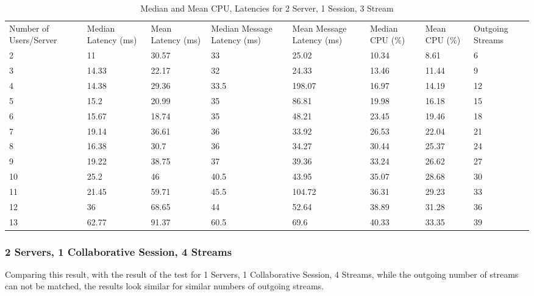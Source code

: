 \begin{table}
\caption{Median and Mean CPU, Latencies for 2 Server, 1 Session, 3 Stream}
\label{table:2serv_1sess_3str}
\begin{tabu} to\linewidth{|X[c]|X[c]|X[c]|X[c]|X[c]|X[c]|X[c]|X[c]|}
\everyrow{\hline}
\hline
Number of Users/Server & Median Latency (ms) & Mean Latency (ms) & Median Message Latency (ms) & Mean Message Latency (ms) & Median CPU (\%) & Mean CPU (\%) & Outgoing Streams\\
2 & 11 & 30.57 & 33 & 25.02 & 10.34 & 8.61 & 6 \\
3 & 14.33 & 22.17 & 32 & 24.33 & 13.46 & 11.44 & 9 \\
4 & 14.38 & 29.36 & 33.5 & 198.07 & 16.97 & 14.19 & 12 \\
5 & 15.2 & 20.99 & 35 & 86.81 & 19.98 & 16.18 & 15 \\
6 & 15.67 & 18.74 & 35 & 48.21 & 23.45 & 19.46 & 18 \\
7 & 19.14 & 36.61 & 36 & 33.92 & 26.53 & 22.04 & 21 \\
8 & 16.38 & 30.7 & 36 & 34.27 & 30.44 & 25.37 & 24 \\
9 & 19.22 & 38.75 & 37 & 39.36 & 33.24 & 26.62 & 27 \\
10 & 25.2 & 46 & 40.5 & 43.95 & 35.07 & 28.68 & 30 \\
11 & 21.45 & 59.71 & 45.5 & 104.72 & 36.31 & 29.23 & 33 \\
12 & 36 & 68.65 & 44 & 52.64 & 38.89 & 31.28 & 36 \\
13 & 62.77 & 91.37 & 60.5 & 69.6 & 40.33 & 33.35 & 39 \\
\end{tabu}
\end{table}

\clearpage\subsubsection{2 Servers, 1 Collaborative Session, 4 Streams}

Comparing this result, with the result of the test for 1 Servers, 1 Collaborative Session, 4 Streams, while the outgoing number of streams can not be matched, the results look similar for similar numbers of outgoing streams.

